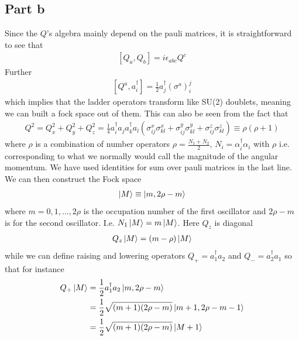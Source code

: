 \documentclass[a4paper,12pt]{article}
\begin{document}
\subsection*{Part b}
Since the $Q$'s algebra mainly depend on the pauli matrices, it is straightforward to see that
\begin{equation}
	\begin{aligned}
		\left[Q_a,Q_b\right]=i \epsilon_{abc}Q^c
	\end{aligned}
\end{equation}
Further
\begin{equation}
	\begin{aligned}
		\left[Q^a,a_i^\dagger\right]=\frac{1}{2}a_j^\dagger (\sigma^a)^j_i
	\end{aligned}
\end{equation}
which implies that the ladder operators transform like SU(2) doublets, meaning we can built a fock space out of them. This can also be seen from the fact that
\begin{equation}
	\begin{aligned}
		Q^2=Q_x^2+Q_y^2+Q_z^2=\frac{1}{4}a_i^\dagger a_j a_k^\dagger a_l \left(\sigma^x_{ij}\sigma^x_{kl}+\sigma^y_{ij}\sigma^y_{kl}+\sigma^z_{ij}\sigma^z_{kl}\right)\equiv\rho(\rho+1)
	\end{aligned}
\end{equation}
where $\rho$ is a combination of number operators $\rho=\frac{N_1+N_2}{2}$, $N_i=\alpha_i^\dagger \alpha_i$ with $\rho$ i.e. corresponding to what we normally would call the magnitude of the angular momentum. We have used identities for sum over pauli matrices in the last line. We can then construct the Fock space
\begin{equation}
	\begin{aligned}
		\ket{M}\equiv \ket{m,2\rho-m}
	\end{aligned}
\end{equation}
where $m=0,1,\dots,2\rho$ is the occupation number of the first oscillator and $2\rho-m$ is for the second oscillator. I.e. $N_1\ket{M}=m\ket{M}$. Here $Q_z$ is diagonal
\begin{equation}
	\begin{aligned}
		Q_z\ket{M}=(m-\rho)\ket{M}
	\end{aligned}
\end{equation}
while we can define raising and lowering operators $Q_+=a_1^\dagger a_2$ and $Q_-=a_2^\dagger a_1$ so that for instance
\begin{equation}
	\begin{aligned}
		Q_+\ket{M}&=\frac{1}{2}a_1^\dagger a_2\ket{m,2\rho-m}\\&=\frac{1}{2}\sqrt{(m+1)(2\rho-m)}\ket{m+1,2\rho-m-1}\\
		&=\frac{1}{2}\sqrt{(m+1)(2\rho-m)}\ket{M+1}
	\end{aligned}
\end{equation}
\end{document}
